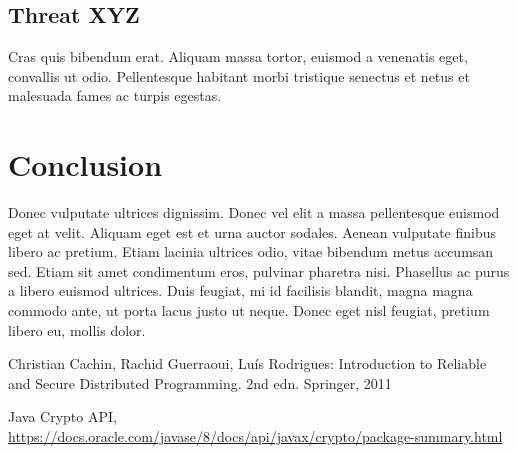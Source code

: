 \documentclass[runningheads]{llncs}
\begin{document}
\subsection{Threat XYZ}
Cras quis bibendum erat. Aliquam massa tortor, euismod a venenatis eget, convallis ut odio. Pellentesque habitant morbi tristique senectus et netus et malesuada fames ac turpis egestas.
%
\section{Conclusion}
Donec vulputate ultrices dignissim. Donec vel elit a massa pellentesque euismod eget at velit. Aliquam eget est et urna auctor sodales. Aenean vulputate finibus libero ac pretium. Etiam lacinia ultrices odio, vitae bibendum metus accumsan sed. Etiam sit amet condimentum eros, pulvinar pharetra nisi. Phasellus ac purus a libero euismod ultrices. Duis feugiat, mi id facilisis blandit, magna magna commodo ante, ut porta lacus justo ut neque. Donec eget nisl feugiat, pretium libero eu, mollis dolor.

\begin{thebibliography}{8}

Christian Cachin, Rachid Guerraoui, Luís Rodrigues: Introduction to Reliable and Secure Distributed Programming. 2nd edn. Springer, 2011

Java Crypto API, \url{https://docs.oracle.com/javase/8/docs/api/javax/crypto/package-summary.html}
\end{thebibliography}
\end{document}
